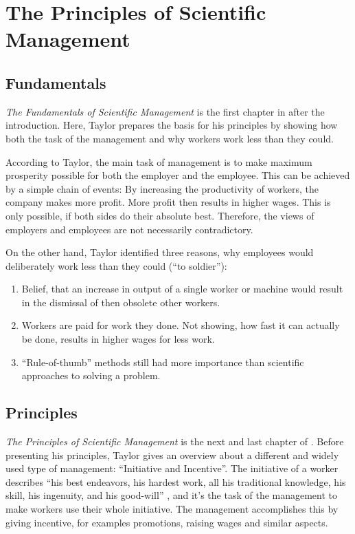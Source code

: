\documentclass[a4paper,11pt]{article}
\newcommand{\enquote}[1]{``#1''}
\begin{document}
\section{The Principles of Scientific Management}
\subsection{Fundamentals}
\textit{The Fundamentals of Scientific Management} is the first chapter in
\cite{book} after the introduction. Here, Taylor prepares the basis for his
principles by showing how both the task of the management and why workers work
less than they could.

According to Taylor, the main task of management is to make maximum prosperity
possible for both the employer and the employee. This can be achieved by a
simple chain of events: By increasing the productivity of workers, the company
makes more profit. More profit then results in higher wages. This is only
possible, if both sides do their absolute best. Therefore, the views of
employers and employees are not necessarily contradictory.

On the other hand, Taylor identified three reasons, why employees would
deliberately work less than they could (\enquote{to soldier}):
\begin{enumerate}
\item Belief, that an increase in output of a single worker or machine would
  result in the dismissal of then obsolete other workers.
\item Workers are paid for work they done. Not showing, how fast it can
  actually be done, results in higher wages for less work.
\item \enquote{Rule-of-thumb} methods still had more importance than
  scientific approaches to solving a problem.
\end{enumerate}

\subsection{Principles}
\textit{The Principles of Scientific Management} is the next and last chapter
of \cite{book}. Before presenting his principles, Taylor gives an overview
about a different and widely used type of management: \enquote{Initiative and
  Incentive}. The initiative of a worker describes \enquote{his best
  endeavors, his hardest work, all his traditional knowledge, his skill, his
  ingenuity, and his good-will} \cite{book}, and it's the task of the
management to make workers use their whole initiative. The management
accomplishes this by giving incentive, for examples promotions, raising wages
and similar aspects.
\end{document}
